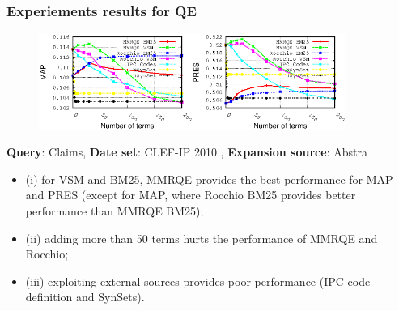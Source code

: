 \documentclass[xcolor=x11names,compress]{beamer}
\renewcommand{\(}{\begin{columns}}
\renewcommand{\)}{\end{columns}}
\newcommand{\<}[1]{\begin{column}{#1}}
\renewcommand{\>}{\end{column}}
\begin{document}
\begin{frame}
\frametitle{Experiements results for QE}


\begin{figure}
\includegraphics[width=5cm]{../Results-CIKM2014/qClaims-sAbstract_MAP_2010}\includegraphics[width=5cm]{../Results-CIKM2014/qClaims-sAbstract_PRES_2010}
\end{figure}

{\small
\textbf{Query}: Claims, 
\textbf{Date set}: CLEF-IP 2010 ,
\textbf{Expansion source}: Abstra
}

\begin{small}
\begin{itemize}
\item (i) for VSM and BM25, MMRQE
provides the best performance for MAP and PRES (except for MAP,
where Rocchio BM25 provides better performance than MMRQE BM25);

\item (ii) adding more than 50 terms hurts the performance of MMRQE and Rocchio;

\item (iii) exploiting external sources provides poor performance (IPC code definition and SynSets). 
\end{itemize}
\end{small}

\end{frame}
\end{document}
